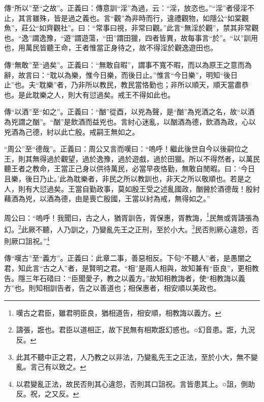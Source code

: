 {\noindent\zhuan{}\fzbyks 傳“所以”至“之故”。正義曰：傳意訓“淫”為過，云：“淫，放恣也。”“淫”者侵淫不止，其言雖殊，皆是過之義也。言“觀”為非時而行，違禮觀物，如隱公“如棠觀魚”，莊公“如齊觀社”。曰：“常事曰視，非常曰觀。”此言“無淫於觀”，禁其非常觀也。“逸”謂逸豫，“遊”謂遊蕩，“田”謂田獵，四者皆異，故每事言“於”。“以”訓用也，用萬民皆聽王命，王者惟當正身待之，故不得淫於觀逸遊田也。 \par}

{\noindent\zhuan{}\fzbyks 傳“無敢”至“過矣”。正義曰：“無敢自暇”，謂事不寬不暇，而以為原王之意而為辭，故言曰：“耽以為樂，惟今日樂，而後日止。”惟言“今日樂”，明知“後日止”也。夫“耽樂”者，乃非所以教民，教民當恪勤也；非所以順天，順天當肅恭也。是此耽樂之人，則大有愆過矣。戒王不得如此也。 \par}

{\noindent\zhuan{}\fzbyks 傳“以酒”至“如之”。正義曰：“酗”從酉，以兇為聲，是“酗”為兇酒之名，故“以酒為兇謂之酗”。“酗”是飲酒而益兇也。言紂心迷亂，以酗酒為德，飲酒為政，心以兇酒為己德，紂以此亡殷。戒嗣王無如之。 \par}

{\noindent\shu{}\fzkt “周公”至“德哉”。正義曰：周公又言而嘆曰：“嗚呼！繼此後世自今以後嗣位之王，則其無得過於觀望，過於逸豫，過於遊戲，過於田獵。所以不得然者，以萬民聽王者之教命，王當正己身以供待萬民，必當早夜恪勤，無敢自閒暇。曰：‘今日且樂，後日乃止。’此為耽樂者，非民之所以教訓也，非天之所以敬順也。若是之人，則有大愆過矣。王當自勤政事，莫如殷王受之述亂國政，酗醟於酒德哉！殷紂藉酒為兇，以酒為德，由是喪亡殷國，王當以紂為戒，無得如之。” \par}

周公曰：“嗚呼！我聞曰，古之人，猶胥訓告，胥保惠，胥教誨，\footnote{嘆古之君臣，雖君明臣良，猶相道告，相安順，相教誨以義方。}民無或胥譸張為幻。\footnote{譸張，誑也。君臣以道相正，故下民無有相欺誑幻惑也。○幻音患。誑，九況反。}此厥不聽，人乃訓之，乃變亂先王之正刑，至於小大。\footnote{此其不聽中正之君，人乃教之以非法，乃變亂先王之正法，至於小大，無不變亂。言己有以致之。}民否則厥心違怨，否則厥口詛祝。”\footnote{以君變亂正法，故民否則其心違怨，否則其口詛祝。言皆患其上。○詛，側助反。祝，之又反。}


{\noindent\zhuan{}\fzbyks 傳“嘆古”至“義方”。正義曰：此章二事，善惡相反。下句“不聽人”者，是愚闇之君，知此言“古之人”者，是賢明之君。“相”是兩人相與，故知兼有“臣良”，更相教告。隱三年石碏曰：“臣聞愛子，教之以義方。”故知相教誨者，使“相教誨以義方”也。則知相訓告者，告之以善道也；相保惠者，相安順以美政也。 \par}

